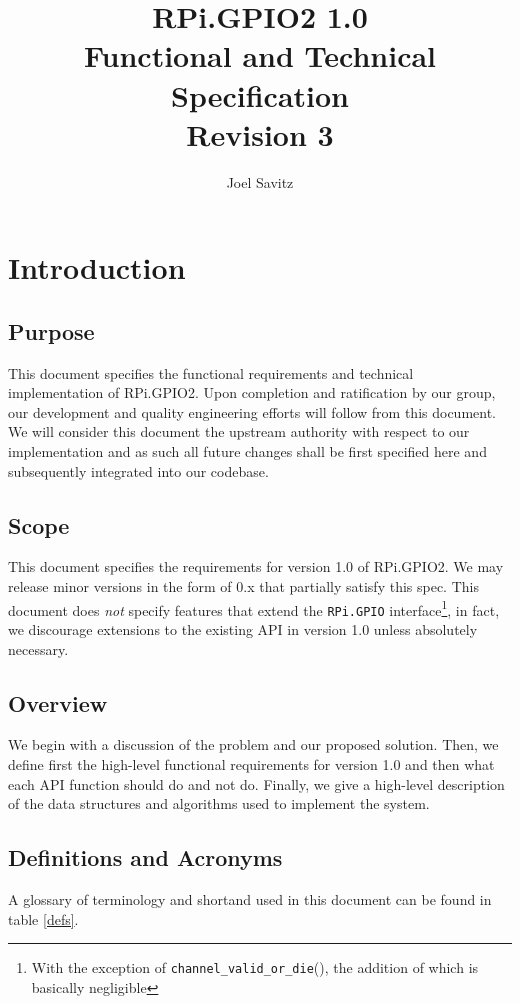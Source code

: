 \documentclass[12pt]{article}
\title{
{RPi.GPIO2 1.0} \\ {Functional and Technical Specification } \\
{\normalsize Revision 3}
}
\author{Joel Savitz}
\begin{document}
\maketitle

\section{Introduction}
\subsection{Purpose}
This document specifies the functional requirements and technical implementation of RPi.GPIO2. Upon completion and ratification by our group, our development and quality engineering efforts will follow from this document. We will consider this document the upstream authority with respect to our implementation and as such all future changes shall be first specified here and subsequently integrated into our codebase.


\subsection{Scope}
This document specifies the requirements for version 1.0 of RPi.GPIO2.
We may release minor versions in the form of 0.x that partially satisfy this spec.
This document does \textit{not} specify features that extend the \texttt{RPi.GPIO}
interface\footnote{With the exception of \texttt{channel\_valid\_or\_die}(), the addition of which is basically negligible}, in fact, we discourage extensions to the existing API
in version 1.0 unless absolutely necessary.


\subsection{Overview}
We begin with a discussion of the problem and our proposed solution. Then, we define first the high-level functional requirements for version 1.0 and then what each API function should do and not do. Finally, we give a high-level description of the data structures and algorithms used to implement the system.


\subsection{Definitions and Acronyms}

A glossary of terminology and shortand used in this document can be found in table \ref{defs}.
\end{document}
